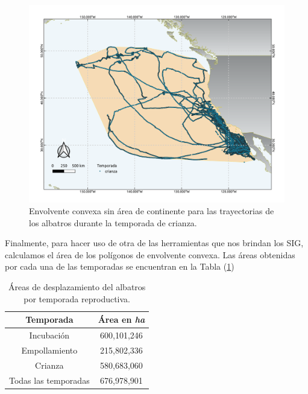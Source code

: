 \begin{figure}[h]
    \centering
    \includegraphics[scale=0.60]{figures/convexHullCrianza.png}
    \caption{Envolvente convexa sin área de continente para las trayectorias
    de los albatros durante la temporada de crianza.}
    \label{fig:convexHullCrianza}
\end{figure}

Finalmente, para hacer uso de otra de las herramientas que nos brindan los SIG,
calculamos el área de los polígonos de envolvente convexa. Las áreas obtenidas
por cada una de las temporadas se encuentran en la Tabla (\ref{tab:areas})

\begin{table}[h]
    \caption{Áreas de desplazamiento del albatros por temporada reproductiva.}
    \begin{center}
        \begin{tabular}{cc}
            Temporada & Área en \textit{ha} \\
            \hline
            Incubación & 600,101,246 \\
            Empollamiento & 215,802,336 \\
            Crianza & 580,683,060 \\
            Todas las temporadas & 676,978,901
        \end{tabular}
        \label{tab:areas}
    \end{center}
\end{table}
